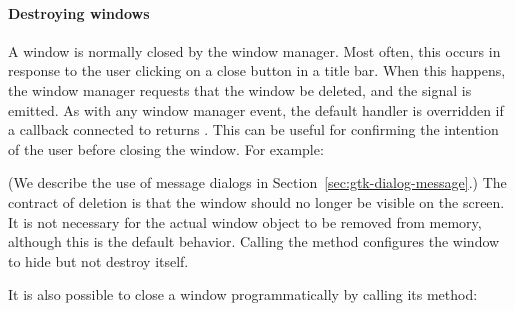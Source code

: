 \paragraph{Destroying windows}
A window is normally closed by the window manager. Most often, this
occurs in response to the user clicking on a close button in a title
bar.  When this happens, the window manager requests that the window be deleted,
and the  signal is emitted. As with any window
manager event, the default handler is overridden if a callback
connected to  returns .  This can be
useful for confirming the intention of the user before closing the
window. For example:
\begin{Schunk}
\end{Schunk}
%
(We describe the use of message dialogs in
Section~\ref{sec:gtk-dialog-message}.) The contract of deletion is that
the window should no longer be visible on the screen. It is not
necessary for the actual window object to be removed from memory,
although this is the default behavior. Calling the 
method configures the window to hide but not destroy itself.

It is also possible to close a window programmatically by calling
its  method:
\begin{Schunk}
\end{Schunk}

